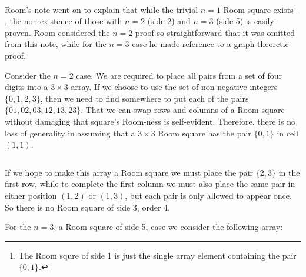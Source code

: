 \documentclass[
  12pt,
  a4paper]{book}
\begin{document}
Room's note went on to explain that while the trivial \(n = 1\) Room square
exists\footnote{The Room squre of side 1 is just the single array element
  containing the pair \(\{0,1\}\).} , the non-existence of those with \(n = 2\) (side 2) and \(n = 3\)
(side 5) is easily proven. Room considered the \(n = 2\) proof so
straightforward that it was omitted from this note, while for the \(n = 3\)
case he made reference to a graph-theoretic proof.

Consider the
\(n = 2\)
case.
We are required to place
all pairs from a set of
four digits into a
\(3 \times 3\)
array.
If we choose to use
the set of non-negative integers
\(\{0, 1, 2, 3\}\),
then we need to
find somewhere to put
each of the pairs
\(\{01, 02, 03, 12, 13, 23\}\).
That we can swap
rows and columns
of a Room square
without damaging that square's Room-ness
is self-evident.
Therefore,
there is no loss of generality
in assuming that a
\(3 \times 3\)
Room square has the pair
\(\{0, 1\}\)
in cell
\((1, 1)\).

\begin{longtable}[]{@{}c@{}}
\toprule
\endhead
\begin{minipage}[t]{0.07\columnwidth}\centering
01\strut
\end{minipage}\tabularnewline
\bottomrule
\end{longtable}

If we hope to make this array a Room square we must place the pair
\(\{2, 3\}\) in the first row, while to complete the first column we must
also place the same pair in either position \((1, 2)\) or \((1, 3)\), but each
pair is only allowed to appear once. So there is no Room square of side
3, order 4.

For the \(n = 3\), a Room square of side 5, case we consider the following
array:
\end{document}
